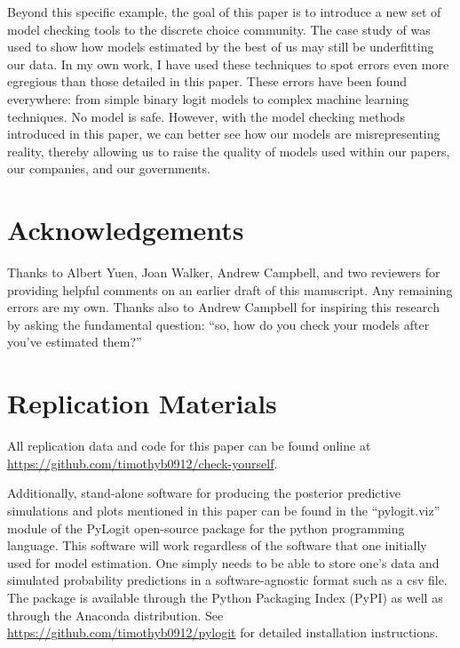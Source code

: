 \documentclass[preprint]{elsarticle}
\begin{document}
Beyond this specific example, the goal of this paper is to introduce a new set of model checking tools to the discrete choice community. The case study of \citet{brownstone_forecasting_1998} was used to show how models estimated by the best of us may still be underfitting our data. In my own work, I have used these techniques to spot errors even more egregious than those detailed in this paper. These errors have been found everywhere: from simple binary logit models to complex machine learning techniques. No model is safe. However, with the model checking methods introduced in this paper, we can better see how our models are misrepresenting reality, thereby allowing us to raise the quality of models used within our papers, our companies, and our governments.

\section*{Acknowledgements}
Thanks to Albert Yuen, Joan Walker, Andrew Campbell, and two reviewers for providing helpful comments on an earlier draft of this manuscript. Any remaining errors are my own. Thanks also to Andrew Campbell for inspiring this research by asking the fundamental question: ``so, how do you check your models after you've estimated them?''

\section*{Replication Materials}
All replication data and code for this paper can be found online at \url{https://github.com/timothyb0912/check-yourself}.

Additionally, stand-alone software for producing the posterior predictive simulations and plots mentioned in this paper can be found in the ``pylogit.viz'' module of the PyLogit open-source package for the python programming language. This software will work regardless of the software that one initially used for model estimation. One simply needs to be able to store one's data and simulated probability predictions in a software-agnostic format such as a csv file. The package is available through the Python Packaging Index (PyPI) as well as through the Anaconda distribution. See \url{https://github.com/timothyb0912/pylogit} for detailed installation instructions.
\end{document}
